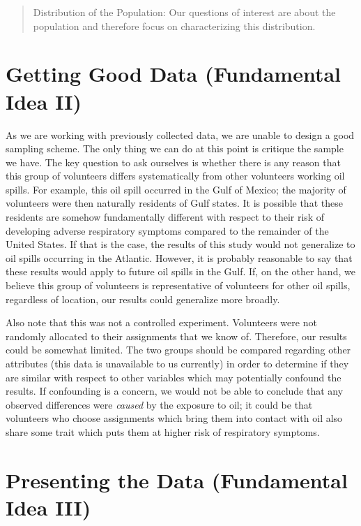 \documentclass[
  letterpaper,
  DIV=11,
  numbers=noendperiod]{scrreprt}
\theoremstyle{plain}
\theoremstyle{definition}
\theoremstyle{definition}
\theoremstyle{remark}
\begin{document}
\begin{quote}
Distribution of the Population: Our questions of interest are about the
population and therefore focus on characterizing this distribution.
\end{quote}

\section{Getting Good Data (Fundamental Idea
II)}\label{getting-good-data-fundamental-idea-ii}

As we are working with previously collected data, we are unable to
design a good sampling scheme. The only thing we can do at this point is
critique the sample we have. The key question to ask ourselves is
whether there is any reason that this group of volunteers differs
systematically from other volunteers working oil spills. For example,
this oil spill occurred in the Gulf of Mexico; the majority of
volunteers were then naturally residents of Gulf states. It is possible
that these residents are somehow fundamentally different with respect to
their risk of developing adverse respiratory symptoms compared to the
remainder of the United States. If that is the case, the results of this
study would not generalize to oil spills occurring in the Atlantic.
However, it is probably reasonable to say that these results would apply
to future oil spills in the Gulf. If, on the other hand, we believe this
group of volunteers is representative of volunteers for other oil
spills, regardless of location, our results could generalize more
broadly.

Also note that this was not a controlled experiment. Volunteers were not
randomly allocated to their assignments that we know of. Therefore, our
results could be somewhat limited. The two groups should be compared
regarding other attributes (this data is unavailable to us currently) in
order to determine if they are similar with respect to other variables
which may potentially confound the results. If confounding is a concern,
we would not be able to conclude that any observed differences were
\emph{caused} by the exposure to oil; it could be that volunteers who
choose assignments which bring them into contact with oil also share
some trait which puts them at higher risk of respiratory symptoms.

\section{Presenting the Data (Fundamental Idea
III)}\label{presenting-the-data-fundamental-idea-iii}
\end{document}
